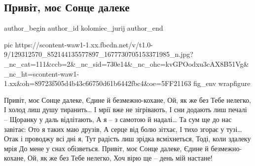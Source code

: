  
 
 
 
 
 
\subsection{Привіт, моє Сонце далеке}
\label{sec:02_12_2020.fb.kolomiec_jurij.1.pryvit_moje_sonce_daleke}
\ifcmt
  author_begin
   author_id kolomiec_jurij
  author_end
\fi

\ifcmt
pic https://scontent-waw1-1.xx.fbcdn.net/v/t1.0-9/129312570_852144135577897_1677730705153371985_n.jpg?_nc_cat=111&ccb=2&_nc_sid=730e14&_nc_ohc=kvGPOodxu3cAX8B51Vg&_nc_ht=scontent-waw1-1.xx&oh=89723f505d4b43c66750d61b6442fbc4&oe=5FF21163
fig_env wrapfigure
\fi

\obeycr
Привіт, моє Сонце далеке,
Єдине й безмежно-кохане,
Ой, як же без Тебе нелегко,
І холод лиш душу тиранить…
І мрії вже не зігрівають,
І сни додають лиш печалі –
Щоранку у даль відлітають,
А я – з самотою й надалі…
Та сум ще до нас завітає:
Ото я таких маю друзів,
А серце від болю зітхає,
І тихо згорає у тузі…
Отак і проводжу всі дні я,
Тут радість лиш зрідка всміхнеться,
Тоді, коли здалеку мрія
До мене у снах обізветься.
Привіт, моє Сонце далеке,
Єдине й безмежно-кохане,
Ой, як же без Тебе нелегко,
Хоч вірю ще – день мій настане!
\restorecr
